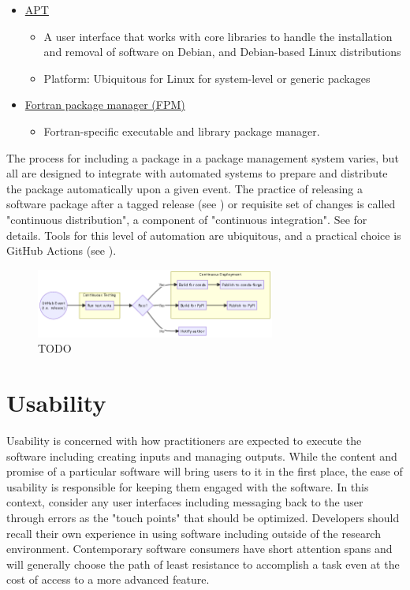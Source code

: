 \documentclass[]{nrel}
\begin{document}
\begin{itemize}
\item \href{https://en.wikipedia.org/wiki/APT\_(software)}{APT}
\begin{itemize}
\item A user interface that works with core libraries to handle the installation and removal of software on Debian, and Debian-based Linux distributions
\item Platform: Ubiquitous for Linux for system-level or generic packages
\end{itemize}

\item \href{https://fpm.fortran-lang.org/index.html}{Fortran package manager (FPM)}
\begin{itemize}
\item Fortran-specific executable and library package manager.
\end{itemize}

\end{itemize}

The process for including a package in a package management system varies, but all are designed
to integrate with automated systems to prepare and distribute the package automatically upon
a given event. The practice of releasing a software package after a tagged release
(see ) or requisite set of changes is called "continuous distribution",
a component of "continuous integration". See  for details.
Tools for this level of automation are ubiquitous, and a practical choice
is GitHub Actions (see ).

\begin{figure}[htbp] \begin{center}
\includegraphics[width=0.7\textwidth]{mermaid-ece5068b3a6eb10d6392a7ca035a7cc4736d3183.png}
\caption{TODO}
\label{fig:fig1} \end{center} \end{figure}


\chapter{Usability}
\label{sec:usability}
Usability is concerned with how practitioners are expected to execute the software including
creating inputs and managing outputs.
While the content and promise of a particular software will bring users to it in the first
place, the ease of usability is responsible for keeping them engaged with the software.
In this context, consider any user interfaces including messaging back to the user through
errors as the "touch points" that should be optimized.
Developers should recall their own experience in using software including outside
of the research environment.
Contemporary software consumers have short attention spans and will generally choose
the path of least resistance to accomplish a task even at the cost of access to a more
advanced feature.
\end{document}
